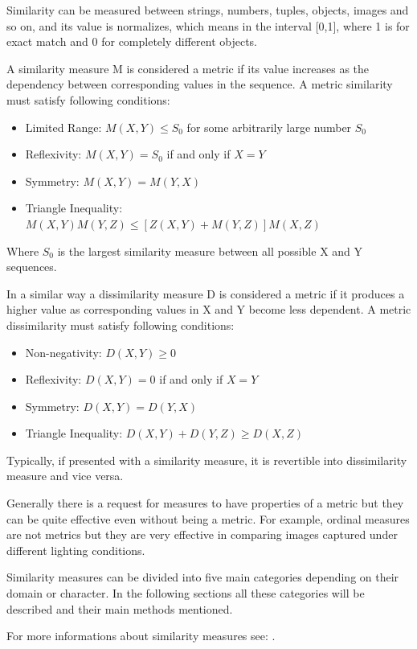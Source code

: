 Similarity can be measured between strings, numbers, tuples, objects, images and so on, and its value is normalizes, which means in the interval [0,1], where 1 is for exact match and 0 for completely different objects. \cite{simDissim}

A similarity measure M is considered a metric if its value increases as the dependency between corresponding values in the sequence. A metric similarity must satisfy following conditions:
\begin{itemize}
\item Limited Range: $M(X,Y) \leq S_0$ for some arbitrarily large number $S_0$
\item Reflexivity: $M(X,Y) = S_0$ if and only if $X=Y$
\item Symmetry: $M(X,Y)=M(Y,X)$
\item Triangle Inequality: $M(X,Y)M(Y,Z)\leq [Z(X,Y)+M(Y,Z)]M(X,Z)$
\end{itemize}
Where $S_0$ is the largest similarity measure between all possible X and Y sequences.

In a similar way a dissimilarity measure D is considered a metric if it produces a higher value as corresponding values in X and Y become less dependent. A metric dissimilarity must satisfy following conditions:
\begin{itemize}
\item Non-negativity: $D(X,Y) \geq 0$
\item Reflexivity: $D(X,Y) = 0$ if and only if $X = Y$
\item Symmetry: $D(X,Y) = D(Y,X)$
\item Triangle Inequality: $D(X,Y) + D(Y,Z) \geq D(X,Z)$
\end{itemize}

Typically, if presented with a similarity measure, it is revertible into dissimilarity measure and vice versa.

Generally there is a request for measures to have properties of a metric but they can be quite effective even without being a metric. For example, ordinal measures are not metrics but they are very effective in comparing images captured under different lighting conditions.

Similarity measures can be divided into five main categories depending on their domain or character. In the following sections all these categories will be described and their main methods mentioned.

For more informations about similarity measures see: \cite{clusteringSimMeasure} \cite{simDissim} \cite{simMeasuresLecture}.
